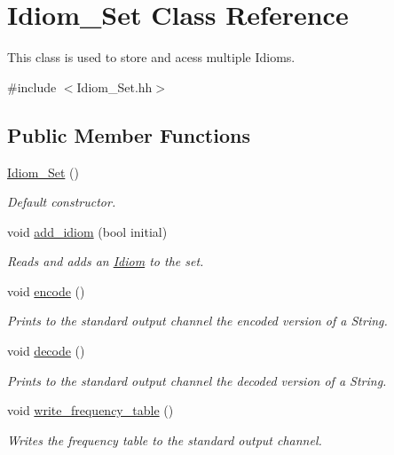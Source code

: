 \hypertarget{classIdiom__Set}{}\section{Idiom\+\_\+\+Set Class Reference}
\label{classIdiom__Set}


This class is used to store and acess multiple Idioms.  




{\ttfamily \#include $<$Idiom\+\_\+\+Set.\+hh$>$}

\subsection*{Public Member Functions}
\begin{DoxyCompactItemize}
\item 
\hyperlink{classIdiom__Set_a39d564382e43baccc4022d61f13da05a}{Idiom\+\_\+\+Set} ()
\begin{DoxyCompactList}\small\item\em Default constructor. \end{DoxyCompactList}\item 
void \hyperlink{classIdiom__Set_af3104a11bb72e006c91961090b257148}{add\+\_\+idiom} (bool initial)
\begin{DoxyCompactList}\small\item\em Reads and adds an \hyperlink{classIdiom}{Idiom} to the set. \end{DoxyCompactList}\item 
void \hyperlink{classIdiom__Set_ae29dfe841bab8b273139d2fc92a93d88}{encode} ()
\begin{DoxyCompactList}\small\item\em Prints to the standard output channel the encoded version of a String. \end{DoxyCompactList}\item 
void \hyperlink{classIdiom__Set_a1b8a15c38adcc4bf7672f0548ede8114}{decode} ()
\begin{DoxyCompactList}\small\item\em Prints to the standard output channel the decoded version of a String. \end{DoxyCompactList}\item 
void \hyperlink{classIdiom__Set_a3b1a40b2c4968b0cab60070f9dcca4d2}{write\+\_\+frequency\+\_\+table} ()
\begin{DoxyCompactList}\small\item\em Writes the frequency table to the standard output channel. \end{DoxyCompactList}\item 

\end{DoxyCompactItemize}
